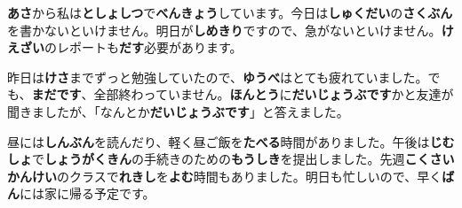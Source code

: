 \textbf{あさ}から私は\textbf{としょしつ}で\textbf{べんきょう}しています。今日は\textbf{しゅくだい}の\textbf{さくぶん}を書かないといけません。明日が\textbf{しめきり}ですので、急がないといけません。\textbf{けえざい}のレポートも\textbf{だす}必要があります。

昨日は\textbf{けさ}までずっと勉強していたので、\textbf{ゆうべ}はとても疲れていました。でも、\textbf{まだです}、全部終わっていません。\textbf{ほんとう}に\textbf{だいじょうぶです}かと友達が聞きましたが、「なんとか\textbf{だいじょうぶです}」と答えました。

昼には\textbf{しんぶん}を読んだり、軽く昼ご飯を\textbf{たべる}時間がありました。午後は\textbf{じむしょ}で\textbf{しょうがくきん}の手続きのための\textbf{もうしき}を提出しました。先週\textbf{こくさいかんけい}のクラスで\textbf{れきし}を\textbf{よむ}時間もありました。明日も忙しいので、早く\textbf{ばん}には家に帰る予定です。


